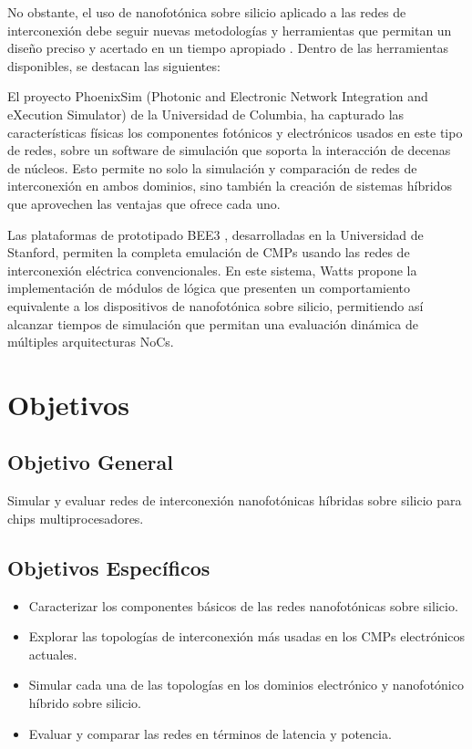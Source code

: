 No obstante, el uso de nanofotónica sobre silicio aplicado a las redes de interconexión
debe seguir nuevas metodologías y herramientas que permitan un diseño preciso y
acertado en un tiempo apropiado \cite{Chan2010b}. Dentro de las herramientas disponibles, se
destacan las siguientes:

El proyecto PhoenixSim \cite{Chan2010} 
(Photonic and Electronic Network Integration and eXecution
Simulator) de la Universidad de Columbia, ha capturado las características físicas los
componentes fotónicos y electrónicos usados en este tipo de redes, sobre un software
de simulación que soporta la interacción de decenas de núcleos. Esto permite no solo la
simulación y comparación de redes de interconexión en ambos dominios, sino también
la creación de sistemas híbridos que aprovechen las ventajas que ofrece cada uno.

Las plataformas de prototipado BEE3 \cite{davis2009bee3}, 
desarrolladas en la Universidad de Stanford,
permiten la completa emulación de CMPs usando las redes de interconexión eléctrica
convencionales. En este sistema, Watts \cite{TODO} propone la implementación de módulos de
lógica que presenten un comportamiento equivalente a los dispositivos de nanofotónica
sobre silicio, permitiendo así alcanzar tiempos de simulación que permitan una
evaluación dinámica de múltiples arquitecturas NoCs.


\section{Objetivos}
\subsection{Objetivo General}
Simular y evaluar redes de interconexión nanofotónicas híbridas 
sobre silicio para chips multiprocesadores.

\subsection{Objetivos Específicos}
\begin{itemize}
\item Caracterizar los componentes básicos de las redes nanofotónicas sobre silicio.
\item Explorar las topologías de interconexión más usadas en los CMPs electrónicos actuales.
\item Simular cada una de las topologías en los dominios electrónico y nanofotónico híbrido sobre silicio.
\item Evaluar y comparar las redes en términos de latencia y potencia.
\end{itemize} 

